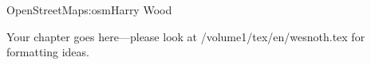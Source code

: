 \begin{aosachapter}{OpenStreetMap}{s:osm}{Harry Wood}

Your chapter goes here---please look at /volume1/tex/en/wesnoth.tex for 
formatting ideas.

\end{aosachapter}
